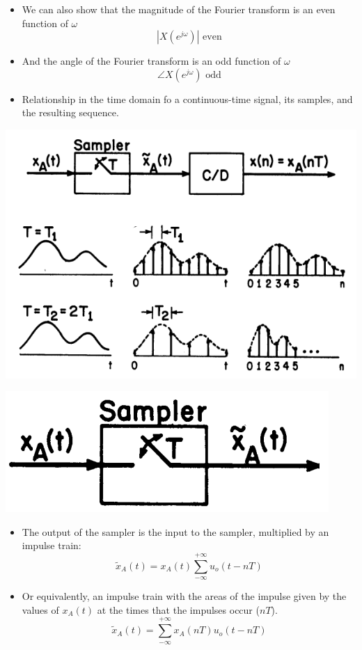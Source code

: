 \documentclass[pdflatex,compress,mathserif]{beamer}
\begin{document}
\begin{frame}
	\begin{itemize}
		\item We can also show that the magnitude of the Fourier transform is an even function of $\omega$
		\[ \left| X(e^{j\omega}) \right| \text{ even}\]
		\item And the angle of the Fourier transform is an odd function of $\omega$
		\[ \angle X(e^{j\omega}) \text{ odd} \]
	\end{itemize}
\end{frame}

\begin{frame}
	\begin{itemize}
		\item Relationship in the time domain fo a continuous-time signal, its samples, and the resulting sequence.
	\end{itemize}
	\begin{center}
		\includegraphics[width=0.7\linewidth]{img/img01}
	\end{center}
\end{frame}

\begin{frame}
	\begin{center}
		\includegraphics[width=0.3\linewidth]{img/img03}
	\end{center}
	\begin{itemize}
		\item The output of the sampler is the input to the sampler, multiplied by an impulse train:
		\[ \tilde{x}_A(t) = x_A(t)\sum_{- \infty}^{+\infty} u_o (t - nT) \]
		\item Or equivalently, an impulse train with the areas of the impulse given by the values of $ x_A(t) $ at the times that the impulses occur ($ nT $).
		\[ \tilde{x}_A(t) = \sum_{- \infty}^{+\infty} x_A(nT) u_o (t - nT) \]
	\end{itemize}
\end{frame}
\end{document}
